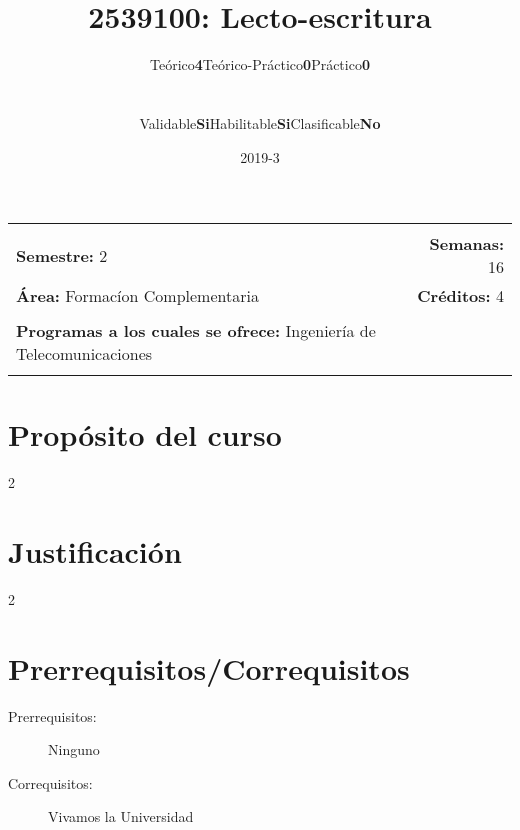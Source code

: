 \documentclass[11pt]{article}
\title{2539100: Lecto-escritura}
\author{\begin{tabular} {c|c|c|c|c|c} Teórico & \textbf{4} & Teórico-Práctico & \textbf{0} & Práctico & \textbf{0}\end{tabular}
\\
\begin{tabular} {c|c|c|c|c|c} Validable & \textbf{Si} & Habilitable & \textbf{Si} & Clasificable & \textbf{No}\end{tabular}}
\date{2019-3}
\newcommand{\blankline}{\quad\pagebreak[2]}
\begin{document}
\maketitle

\begin{tabular*}{.93\textwidth}{@{\extracolsep{\fill}}lr}
\hline\\

\textbf{Semestre:} 2 & \textbf{Semanas:} 16
\\
\textbf{Área:} Formacíon Complementaria &    \textbf{Créditos:} 4 
\\ & \\
\textbf{Programas a los cuales se ofrece:} Ingeniería de Telecomunicaciones
\\ & \\
\hline
\end{tabular*}

\vspace{5 mm}

\section*{Propósito del curso}

2



\section*{Justificación}

2

\section*{Prerrequisitos/Correquisitos}
\begin{description}
\item [Prerrequisitos:] Ninguno
\item[Correquisitos:] Vivamos la Universidad
\end{description}
\end{document}
